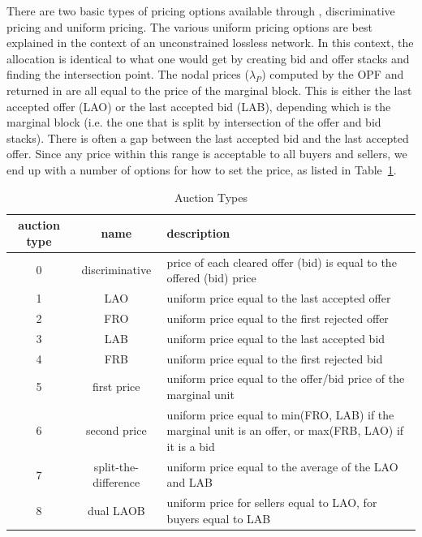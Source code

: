 \documentclass[12pt]{article}
\newcommand{\code}[1]{{\relsize{-0.5}{\tt{{#1}}}}}  %
\numberwithin{equation}{section}
\numberwithin{table}{section}
\numberwithin{figure}{section}
\begin{document}
\begin{appendices}
There are two basic types of pricing options available through \code{mkt.auction\_type}, discriminative pricing and uniform pricing. The various uniform pricing options are best explained in the context of an unconstrained lossless network. In this context, the allocation is identical to what one would get by creating bid and offer stacks and finding the intersection point. The nodal prices ($\lambda_P$) computed by the OPF and returned in \code{bus(:,LAM\_P)} are all equal to the price of the marginal block. This is either the last accepted offer (LAO) or the last accepted bid (LAB), depending which is the marginal block (i.e. the one that is split by intersection of the offer and bid stacks). There is often a gap between the last accepted bid and the last accepted offer. Since any price within this range is acceptable to all buyers and sellers, we end up with a number of options for how to set the price, as listed in Table~\ref{tab:auction_types}.

\begin{table}[!ht]
\centering
\begin{threeparttable}
\caption{Auction Types}
\label{tab:auction_types}
\footnotesize
\begin{tabular}{ccp{}}
\toprule
auction type & name & description \\
\midrule
0	& discriminative	& price of each cleared offer (bid) is equal to the offered (bid) price \\
1	& LAO	& uniform price equal to the last accepted offer \\
2	& FRO	& uniform price equal to the first rejected offer \\
3	& LAB	& uniform price equal to the last accepted bid \\
4	& FRB	& uniform price equal to the first rejected bid \\
5	& first price	& uniform price equal to the offer/bid price of the marginal unit \\
6	& second price	& uniform price equal to min(FRO, LAB) if the marginal unit is an offer, or max(FRB, LAO) if it is a bid \\
7	& split-the-difference	& uniform price equal to the average of the LAO and LAB \\
8	& dual LAOB	& uniform price for sellers equal to LAO, for buyers equal to LAB \\
\bottomrule
\end{tabular}
\end{threeparttable}
\end{table}


\end{appendices}
\end{document}
